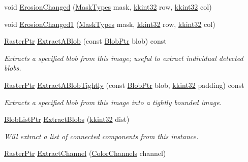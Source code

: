 \begin{DoxyCompactItemize}
\item 
void \hyperlink{class_k_k_b_1_1_raster_a9cf44682126ede6d178929102e91347e}{Erosion\+Changed} (\hyperlink{class_k_k_b_1_1_morph_op_a9eaa0383bf9e046da208af397e7e35eb}{Mask\+Types} mask, \hyperlink{namespace_k_k_b_a8fa4952cc84fda1de4bec1fbdd8d5b1b}{kkint32} row, \hyperlink{namespace_k_k_b_a8fa4952cc84fda1de4bec1fbdd8d5b1b}{kkint32} col)
\item 
void \hyperlink{class_k_k_b_1_1_raster_ac63c5c6b86add9da92cd2e8d833b2c6c}{Erosion\+Changed1} (\hyperlink{class_k_k_b_1_1_morph_op_a9eaa0383bf9e046da208af397e7e35eb}{Mask\+Types} mask, \hyperlink{namespace_k_k_b_a8fa4952cc84fda1de4bec1fbdd8d5b1b}{kkint32} row, \hyperlink{namespace_k_k_b_a8fa4952cc84fda1de4bec1fbdd8d5b1b}{kkint32} col)
\item 
\hyperlink{class_k_k_b_1_1_raster_aefa532857fd6aa9eb53f79da55a97c5a}{Raster\+Ptr} \hyperlink{class_k_k_b_1_1_raster_a920f703a69e0585fb8983ecb3fa032f0}{Extract\+A\+Blob} (const \hyperlink{namespace_k_k_b_a4fa91a7788b982654fca9d7319b98cb4}{Blob\+Ptr} blob) const 
\begin{DoxyCompactList}\small\item\em Extracts a specified blob from this image; useful to extract individual detected blobs. \end{DoxyCompactList}\item 
\hyperlink{class_k_k_b_1_1_raster_aefa532857fd6aa9eb53f79da55a97c5a}{Raster\+Ptr} \hyperlink{class_k_k_b_1_1_raster_a6f5f3da9439ecb65a8bb485f669d1759}{Extract\+A\+Blob\+Tightly} (const \hyperlink{namespace_k_k_b_a4fa91a7788b982654fca9d7319b98cb4}{Blob\+Ptr} blob, \hyperlink{namespace_k_k_b_a8fa4952cc84fda1de4bec1fbdd8d5b1b}{kkint32} padding) const 
\begin{DoxyCompactList}\small\item\em Extracts a specified blob from this image into a tightly bounded image. \end{DoxyCompactList}\item 
\hyperlink{namespace_k_k_b_a43f0fcfaef97a91bc290134c9a407d4d}{Blob\+List\+Ptr} \hyperlink{class_k_k_b_1_1_raster_a5d6059f6d0020e493683b2a00a6a8821}{Extract\+Blobs} (\hyperlink{namespace_k_k_b_a8fa4952cc84fda1de4bec1fbdd8d5b1b}{kkint32} dist)
\begin{DoxyCompactList}\small\item\em Will extract a list of connected components from this instance. \end{DoxyCompactList}\item 
\hyperlink{class_k_k_b_1_1_raster_aefa532857fd6aa9eb53f79da55a97c5a}{Raster\+Ptr} \hyperlink{class_k_k_b_1_1_raster_afe394fc6faac00f67a5cde4c1f3b70cb}{Extract\+Channel} (\hyperlink{namespace_k_k_b_a91743d17eafa05c7ff4e08017ac2b718}{Color\+Channels} channel)

\end{DoxyCompactItemize}
